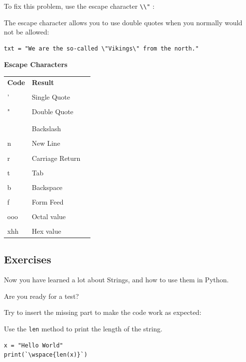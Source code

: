 \documentclass[12pt,a4paper]{article}
\newcommand{\wspace}[1]{%
	\color{white}\colorbox{white}{\texttt{#1}}%
}
\newcommand{\code}[1]{%
	\colorbox{backcolour}{\lstinline{#1}}%
}
\newcommand{\lcode}[1]{%
	\lstinline{#1}%
}
\newcommand{\tcol}[2]{%
	\quad #1 & #2 \\
}
\begin{document}
To fix this problem, use the escape character \code{\\"}:

\begin{ebox}
The escape character allows you to use double quotes when you normally would
not be allowed:
	\begin{lstlisting}
txt = "We are the so-called \"Vikings\" from the north."
	\end{lstlisting}
\end{ebox}

\textbf{Escape Characters}

\begin{table}[h]
	\begin{center}
		\begin{tabularx}{.5\textwidth}{Xll}
	\tcol{\textbf{Code}}	{\textbf{Result}}
	\tcol{\lcode{\\'}}		{Single Quote}
	\tcol{\lcode{\\"}}		{Double Quote}
	\tcol{\lcode{\\\\}}		{Backslash}
	\tcol{\lcode{\\n}}		{New Line}
	\tcol{\lcode{\\r}}		{Carriage Return}
	\tcol{\lcode{\\t}}		{Tab}
	\tcol{\lcode{\\b}}		{Backspace}
	\tcol{\lcode{\\f}}		{Form Feed}
	\tcol{\lcode{\\ooo}}	{Octal value}
	\tcol{\lcode{\\xhh}}	{Hex value}
		\end{tabularx}
	\end{center}
\end{table}
\vfill\newpage
\subsection{Exercises}
Now you have learned a lot about Strings, and how to use them in Python.

Are you ready for a test?

Try to insert the missing part to make the code work as expected:

\vspace{1cm}

\begin{tbox}
Use the \code{len} method to print the length of the string.

	\begin{lstlisting}[numbers=none]
x = "Hello World"
print(`\wspace{len(x)}`)
	\end{lstlisting}
\end{tbox}
\vfill\newpage
\end{document}
